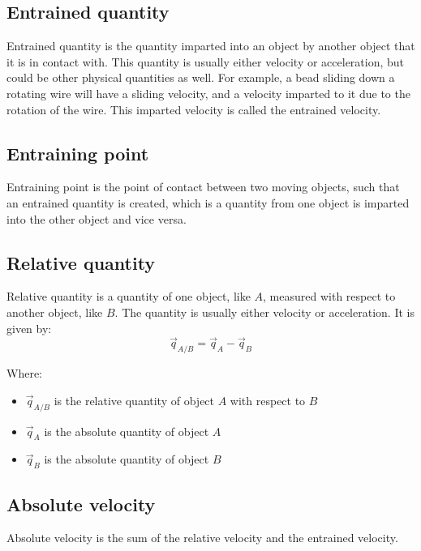\documentclass[11pt]{article}
\begin{document}
 \newpage
\subsection{Entrained quantity}
\label{sec:org0d0b208}
Entrained quantity is the quantity imparted into an object by another object that it is in contact with. This quantity is usually either velocity or acceleration, but could be other physical quantities as well. For example, a bead sliding down a rotating wire will have a sliding velocity, and a velocity imparted to it due to the rotation of the wire. This imparted velocity is called the entrained velocity.
\subsection{Entraining point}
\label{sec:org54d86bc}
Entraining point is the point of contact between two moving objects, such that an entrained quantity is created, which is a quantity from one object is imparted into the other object and vice versa.
\subsection{Relative quantity}
\label{sec:org09835a2}
Relative quantity is a quantity of one object, like \(A\), measured with respect to another object, like \(B\). The quantity is usually either velocity or acceleration. It is given by:
\[\vec{q}_{A/B} = \vec{q}_A - \vec{q}_B\]

Where:
\begin{itemize}
\item \(\vec{q}_{A/B}\) is the relative quantity of object \(A\) with respect to \(B\)
\item \(\vec{q}_A\) is the absolute quantity of object \(A\)
\item \(\vec{q}_B\) is the absolute quantity of object \(B\)
\end{itemize}

 \newpage
\subsection{Absolute velocity}
\label{sec:org04f0424}
Absolute velocity is the sum of the relative velocity and the entrained velocity.
\end{document}
